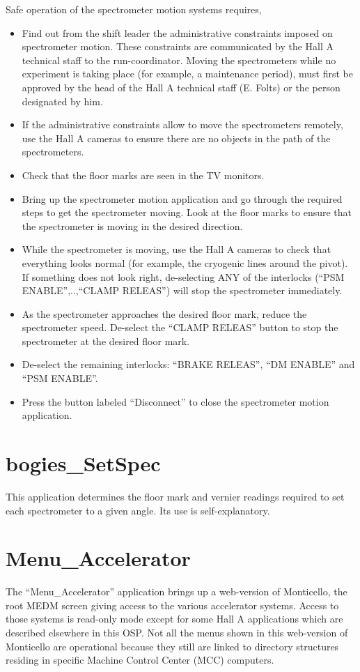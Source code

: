 {{\begin{safetyen}{30}{10}
Safe operation of the spectrometer motion systems requires,
\begin{itemize}
\item Find out from the shift leader the administrative constraints imposed on
spectrometer motion.
These constraints are communicated by the Hall A technical staff to the run-coordinator.
Moving the spectrometers while no experiment is taking place (for example,
a maintenance period), must first be approved by the head of the Hall A technical
staff (E. Folts) or the person designated by him.
\item If the administrative constraints allow to move the spectrometers remotely,
use the Hall A cameras
to ensure there are no objects in the path of the spectrometers.
\item Check that the floor marks are seen in the TV monitors.
\item Bring up the spectrometer motion application and go through the required steps
to get the spectrometer moving. Look at the floor marks
to ensure that the spectrometer is moving in the desired direction.
\item While the spectrometer is moving, use
the Hall A cameras to check that everything looks normal (for example, the cryogenic lines
around the pivot). If something does not look right, de-selecting ANY of the
interlocks (``PSM ENABLE'',..,``CLAMP RELEAS'') will stop the spectrometer immediately.
\item As the spectrometer approaches the desired floor mark, reduce the spectrometer
speed. De-select the ``CLAMP RELEAS'' button to stop the spectrometer at the desired floor mark.
\item De-select the remaining interlocks: ``BRAKE RELEAS'', ``DM ENABLE'' and ``PSM ENABLE''.
\item Press the button labeled ``Disconnect'' to close the spectrometer motion
application.
\end{itemize}
\end{safetyen}

\section{bogies\_SetSpec}
This application determines the floor mark and vernier readings required
to set each spectrometer to a given angle. Its use is self-explanatory.

\section{Menu\_Accelerator}
The ``Menu\_Accelerator'' application brings up a web-version of Monticello,
the root MEDM screen giving access to the various accelerator systems. Access to those
systems is read-only mode except for some Hall A applications which are described elsewhere
in this OSP. Not all the menus shown in this web-version of Monticello are operational
because they still are linked to directory structures residing in specific
Machine Control Center (MCC) computers.

}}
